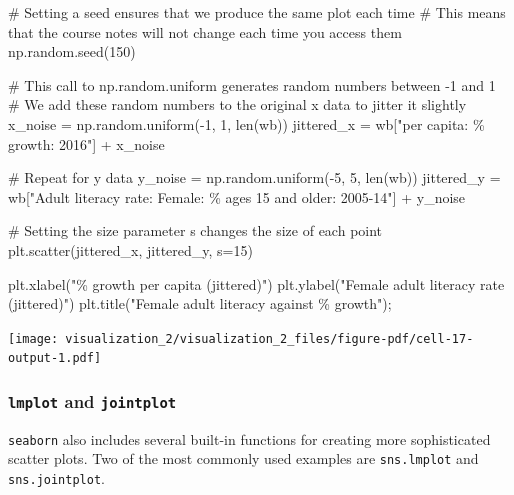 \documentclass[
  letterpaper,
  DIV=11,
  numbers=noendperiod]{scrreprt}
\newenvironment{Shaded}{\begin{snugshade}}{\end{snugshade}}
\newcommand{\BuiltInTok}[1]{\textcolor[rgb]{0.00,0.23,0.31}{#1}}
\newcommand{\CommentTok}[1]{\textcolor[rgb]{0.37,0.37,0.37}{#1}}
\newcommand{\DecValTok}[1]{\textcolor[rgb]{0.68,0.00,0.00}{#1}}
\newcommand{\NormalTok}[1]{\textcolor[rgb]{0.00,0.23,0.31}{#1}}
\newcommand{\OperatorTok}[1]{\textcolor[rgb]{0.37,0.37,0.37}{#1}}
\newcommand{\SpecialCharTok}[1]{\textcolor[rgb]{0.37,0.37,0.37}{#1}}
\newcommand{\StringTok}[1]{\textcolor[rgb]{0.13,0.47,0.30}{#1}}
\begin{document}
\begin{Shaded}
\begin{Highlighting}[]
\CommentTok{\# Setting a seed ensures that we produce the same plot each time}
\CommentTok{\# This means that the course notes will not change each time you access them}
\NormalTok{np.random.seed(}\DecValTok{150}\NormalTok{)}

\CommentTok{\# This call to np.random.uniform generates random numbers between {-}1 and 1}
\CommentTok{\# We add these random numbers to the original x data to jitter it slightly}
\NormalTok{x\_noise }\OperatorTok{=}\NormalTok{ np.random.uniform(}\OperatorTok{{-}}\DecValTok{1}\NormalTok{, }\DecValTok{1}\NormalTok{, }\BuiltInTok{len}\NormalTok{(wb))}
\NormalTok{jittered\_x }\OperatorTok{=}\NormalTok{ wb[}\StringTok{"per capita: }\SpecialCharTok{\% g}\StringTok{rowth: 2016"}\NormalTok{] }\OperatorTok{+}\NormalTok{ x\_noise}

\CommentTok{\# Repeat for y data}
\NormalTok{y\_noise }\OperatorTok{=}\NormalTok{ np.random.uniform(}\OperatorTok{{-}}\DecValTok{5}\NormalTok{, }\DecValTok{5}\NormalTok{, }\BuiltInTok{len}\NormalTok{(wb))}
\NormalTok{jittered\_y }\OperatorTok{=}\NormalTok{ wb[}\StringTok{"Adult literacy rate: Female: \% ages 15 and older: 2005{-}14"}\NormalTok{] }\OperatorTok{+}\NormalTok{ y\_noise}

\CommentTok{\# Setting the size parameter \textasciigrave{}s\textasciigrave{} changes the size of each point}
\NormalTok{plt.scatter(jittered\_x, jittered\_y, s}\OperatorTok{=}\DecValTok{15}\NormalTok{)}

\NormalTok{plt.xlabel(}\StringTok{"}\SpecialCharTok{\% g}\StringTok{rowth per capita (jittered)"}\NormalTok{)}
\NormalTok{plt.ylabel(}\StringTok{"Female adult literacy rate (jittered)"}\NormalTok{)}
\NormalTok{plt.title(}\StringTok{"Female adult literacy against }\SpecialCharTok{\% g}\StringTok{rowth"}\NormalTok{)}\OperatorTok{;}
\end{Highlighting}
\end{Shaded}

\texttt{[image: visualization\_2/visualization\_2\_files/figure-pdf/cell-17-output-1.pdf]}

\subsubsection{\texorpdfstring{\texttt{lmplot} and
\texttt{jointplot}}{lmplot and jointplot}}\label{lmplot-and-jointplot}

\texttt{seaborn} also includes several built-in functions for creating
more sophisticated scatter plots. Two of the most commonly used examples
are \texttt{sns.lmplot} and \texttt{sns.jointplot}.
\end{document}
